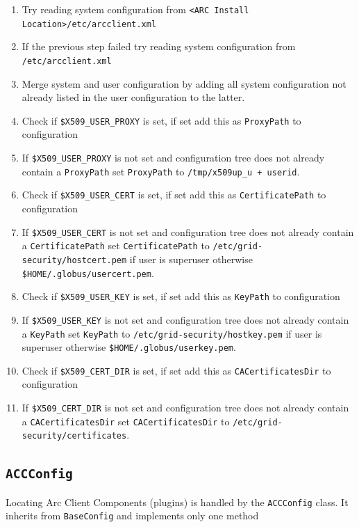 \documentclass{book}
\newcommand{\ACCConfig}{\texttt{ACCConfig}}
\begin{document}
\begin{enumerate}
\item{Try reading system configuration from \texttt{<ARC Install Location>/etc/arcclient.xml}}
\item{If the previous step failed try reading system configuration from \texttt{/etc/arcclient.xml}}
\item{Merge system and user configuration by adding all system configuration not already listed 
in the user configuration to the latter.}
\item{Check if \texttt{\$X509\_USER\_PROXY} is set, if set add this as \texttt{ProxyPath} to configuration}
\item{If \texttt{\$X509\_USER\_PROXY} is not set and configuration tree does not already contain 
a \texttt{ProxyPath} set \texttt{ProxyPath} to \texttt{/tmp/x509up\_u + userid}.}
\item{Check if \texttt{\$X509\_USER\_CERT} is set, if set add this as \texttt{CertificatePath} to configuration}
\item{If \texttt{\$X509\_USER\_CERT} is not set and configuration tree does not already contain 
a \texttt{CertificatePath} set \texttt{CertificatePath} to \texttt{/etc/grid-security/hostcert.pem} 
if user is superuser otherwise \newline
\texttt{\$HOME/.globus/usercert.pem}.}
\item{Check if \texttt{\$X509\_USER\_KEY} is set, if set add this as \texttt{KeyPath} to configuration}
\item{If \texttt{\$X509\_USER\_KEY} is not set and configuration tree does not already contain 
a \texttt{KeyPath} set \texttt{KeyPath} to \texttt{/etc/grid-security/hostkey.pem}
if user is superuser otherwise \texttt{\$HOME/.globus/userkey.pem}.}
\item{Check if \texttt{\$X509\_CERT\_DIR} is set, if set add this as \texttt{CACertificatesDir} to configuration}
\item{If \texttt{\$X509\_CERT\_DIR} is not set and configuration tree does not already contain 
a \texttt{CACertificatesDir} set \texttt{CACertificatesDir} to \texttt{/etc/grid-security/certificates}.}
\end{enumerate}

\subsection{{\ACCConfig}}
Locating Arc Client Components (plugins) is handled by the {\ACCConfig} class. It inherits from \texttt{BaseConfig} 
and implements only one method
\end{document}
